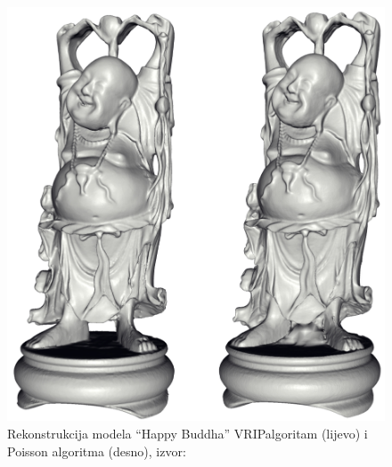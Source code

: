\begin{figure}[h]
\centering
\includegraphics[scale=0.18]{figures/poisson-buddha.png}
\caption[]{Rekonstrukcija modela ``Happy Buddha'' 
VRIP\footnotemark[2] algoritam (lijevo) i Poisson algoritma (desno),
izvor:~\cite{Kazhdan:2006}}
\label{fig:poisson-buddha.png}
\end{figure}

\newpage
{}


